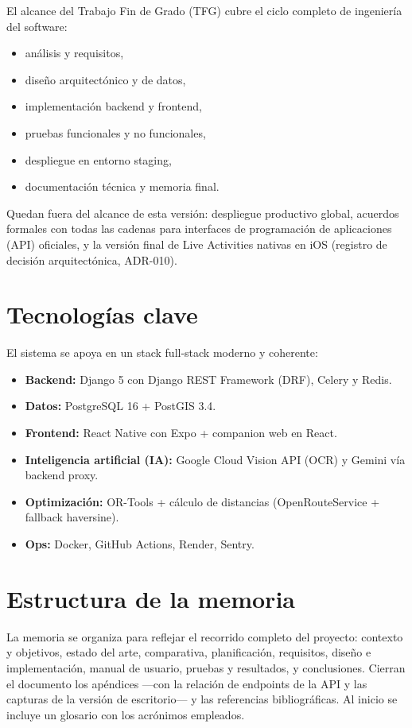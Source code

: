 El alcance del Trabajo Fin de Grado (TFG) cubre el ciclo completo de ingenier\'ia del software:

\begin{itemize}
	\item an\'alisis y requisitos,
	\item dise\~no arquitect\'onico y de datos,
	\item implementaci\'on backend y frontend,
	\item pruebas funcionales y no funcionales,
	\item despliegue en entorno staging,
	\item documentaci\'on t\'ecnica y memoria final.
\end{itemize}

Quedan fuera del alcance de esta versi\'on: despliegue productivo global,
acuerdos formales con todas las cadenas para interfaces de programaci\'on de aplicaciones (API)
oficiales, y la versi\'on final de Live Activities nativas en iOS (registro de decisi\'on
arquitect\'onica, ADR-010).

\section{Tecnolog\'ias clave}

El sistema se apoya en un stack full-stack moderno y coherente:

\begin{itemize}
	\item \textbf{Backend:} Django 5 con Django REST Framework (DRF), Celery y Redis.
	\item \textbf{Datos:} PostgreSQL 16 + PostGIS 3.4.
	\item \textbf{Frontend:} React Native con Expo + companion web en React.
	\item \textbf{Inteligencia artificial (IA):} Google Cloud Vision API (OCR) y Gemini v\'ia
		backend proxy.
	\item \textbf{Optimizaci\'on:} OR-Tools + c\'alculo de distancias (OpenRouteService +
		fallback haversine).
	\item \textbf{Ops:} Docker, GitHub Actions, Render, Sentry.
\end{itemize}

\section{Estructura de la memoria}

La memoria se organiza para reflejar el recorrido completo del proyecto: contexto y objetivos,
estado del arte, comparativa, planificaci\'on, requisitos, dise\~no e implementaci\'on,
manual de usuario, pruebas y resultados, y conclusiones. Cierran el documento los ap\'endices
---con la relaci\'on de endpoints de la API y las capturas de la versi\'on de escritorio--- y las
referencias bibliogr\'aficas. Al inicio se incluye un glosario con los acr\'onimos empleados.
